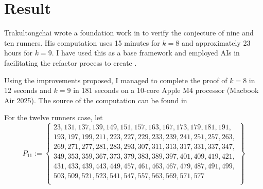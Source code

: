 \documentclass[10pt,leqno]{amsart}
\newcommand{\set}[1]{\left\{#1\right\}}
\newcommand{\abs}[1]{\left|#1\right|}
\begin{document}
%

\section*{Result}

Trakultongchai wrote a foundation work in \cite{tanupatcode} to verify the conjecture of nine and ten runners. His computation uses 
15 minutes for $k=8$ and approximately 23 hours for $k=9$. I have used this as a base framework and employed AIs in facilitating the 
refactor process to create \cite{mycode}.

Using the improvements proposed, I managed to complete the proof of $k=8$ in 12 seconds and $k=9$ in 181 seconds on a 10-core 
Apple M4 processor (Macbook Air 2025). The source of the computation can be found in \cite{mycode}

For the twelve runners case, let \[ P_{11} := \set{ \begin{aligned} 
      23, 131, 137, 139, 149, 151, 157, 163, 167, 173, 179, 181, 191, \\ 
      193, 197, 199, 211, 223, 227, 229, 233, 239, 241, 251, 257, 263, \\
      269, 271, 277, 281, 283, 293, 307, 311, 313, 317, 331, 337, 347, \\
      349, 353, 359, 367, 373, 379, 383, 389, 397, 401, 409, 419, 421, \\
      431, 433, 439, 443, 449, 457, 461, 463, 467, 479, 487, 491, 499, \\ 
      503, 509, 521, 523, 541, 547, 557, 563, 569, 571, 577 \\
    \end{aligned}
  } \]
\end{document}
